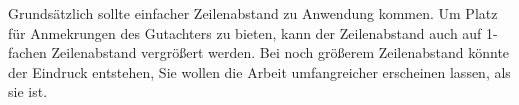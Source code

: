 Grundsätzlich sollte einfacher Zeilenabstand zu Anwendung kommen. Um Platz
für Anmekrungen des Gutachters zu bieten, kann der Zeilenabstand auch auf
1-fachen Zeilenabstand vergrößert werden. Bei noch größerem
Zeilenabstand könnte der Eindruck entstehen, Sie wollen die Arbeit
umfangreicher erscheinen lassen, als sie ist.





%
%
